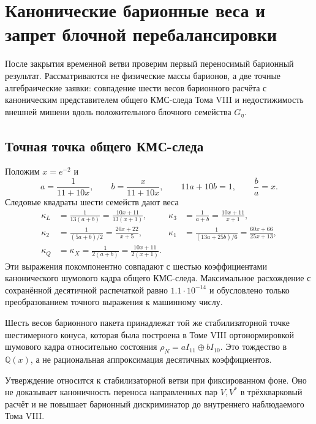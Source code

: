\chapter{Канонические барионные веса и запрет блочной перебалансировки}
\label{ch:v8-baryon-canonical-weights-geta-no-go-gate}

После закрытия временной ветви проверим первый переносимый барионный
результат. Рассматриваются не физические массы барионов, а две точные
алгебраические заявки: совпадение шести весов барионного расчёта с
каноническим представителем общего КМС-следа Тома VIII и недостижимость
внешней мишени вдоль положительного блочного семейства $G_\eta$.

\section{Точная точка общего КМС-следа}

Положим $x=e^{-2}$ и
\begin{equation}
 a=\frac1{11+10x},
 \qquad
 b=\frac{x}{11+10x},
 \qquad
 11a+10b=1,
 \qquad
 \frac ba=x.
 \label{eq:v8-baryon-kms-density}
\end{equation}
Следовые квадраты шести семейств дают веса
\begin{align}
 \kappa_L&=\frac1{13(a+b)}
 =\frac{10x+11}{13(x+1)},
 &
 \kappa_{3}&=\frac1{a+b}
 =\frac{10x+11}{x+1},
 \nonumber\\
 \kappa_{2}&=\frac1{(5a+b)/2}
 =\frac{20x+22}{x+5},
 &
 \kappa_{1}&=\frac1{(13a+25b)/6}
 =\frac{60x+66}{25x+13},
 \nonumber\\
 \kappa_Q&=\kappa_X=\frac1{2(a+b)}
 =\frac{10x+11}{2(x+1)}.
 \label{eq:v8-baryon-six-exact-weights}
\end{align}
Эти выражения покомпонентно совпадают с шестью коэффициентами
канонического шумового кадра общего КМС-следа. Максимальное расхождение с
сохранённой десятичной распечаткой равно $1.1\cdot10^{-14}$ и обусловлено
только преобразованием точного выражения к машинному числу.

\begin{proposition}
Шесть весов барионного пакета принадлежат той же стабилизаторной точке
шестимерного конуса, которая была построена в Томе VIII ортонормировкой
шумового кадра относительно состояния
$\rho_N=aI_{11}\oplus bI_{10}$. Это тождество в $\mathbb Q(x)$, а не
рациональная аппроксимация десятичных коэффициентов.
\end{proposition}

Утверждение относится к стабилизаторной ветви при фиксированном фоне.
Оно не доказывает каноничность переноса направленных пар $V,V^*$ в
трёхкварковый расчёт и не повышает барионный дискриминатор до внутреннего
наблюдаемого Тома VIII.

